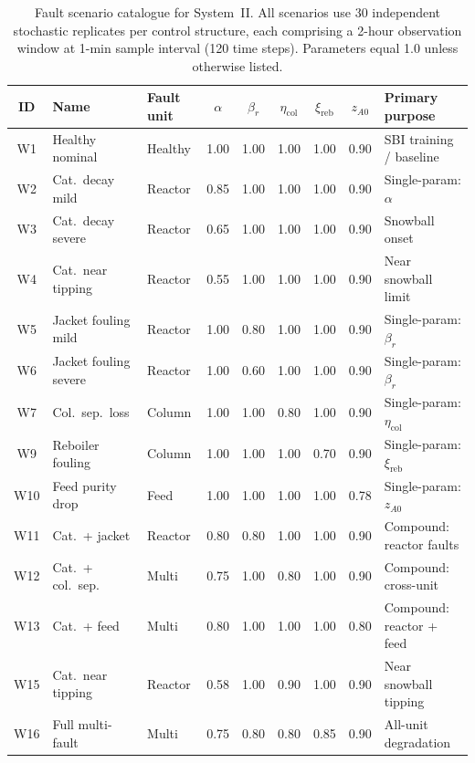 \documentclass[aps,pre,twocolumn,superscriptaddress,floatfix]{revtex4-2}
\begin{document}
\begin{table}[tb]
\centering
\caption{Fault scenario catalogue for System~II. All scenarios use 30 independent
  stochastic replicates per control structure, each comprising a 2-hour observation
  window at 1-min sample interval (120 time steps). Parameters equal 1.0 unless
  otherwise listed.}
\label{tab:si_wu_scenarios}
\small
\begin{tabular}{cllcccccl}
\toprule
ID & Name & Fault unit & $\alpha$ & $\beta_r$ & $\eta_\mathrm{col}$ & $\xi_\mathrm{reb}$ & $z_{A0}$ & Primary purpose \\
\midrule
W1  & Healthy nominal     & Healthy  & 1.00 & 1.00 & 1.00 & 1.00 & 0.90 & SBI training / baseline \\
W2  & Cat.~decay mild     & Reactor  & 0.85 & 1.00 & 1.00 & 1.00 & 0.90 & Single-param: $\alpha$ \\
W3  & Cat.~decay severe   & Reactor  & 0.65 & 1.00 & 1.00 & 1.00 & 0.90 & Snowball onset \\
W4  & Cat.~near tipping   & Reactor  & 0.55 & 1.00 & 1.00 & 1.00 & 0.90 & Near snowball limit \\
W5  & Jacket fouling mild & Reactor  & 1.00 & 0.80 & 1.00 & 1.00 & 0.90 & Single-param: $\beta_r$ \\
W6  & Jacket fouling severe& Reactor & 1.00 & 0.60 & 1.00 & 1.00 & 0.90 & Single-param: $\beta_r$ \\
W7  & Col.~sep.~loss      & Column   & 1.00 & 1.00 & 0.80 & 1.00 & 0.90 & Single-param: $\eta_\mathrm{col}$ \\
W9  & Reboiler fouling    & Column   & 1.00 & 1.00 & 1.00 & 0.70 & 0.90 & Single-param: $\xi_\mathrm{reb}$ \\
W10 & Feed purity drop    & Feed     & 1.00 & 1.00 & 1.00 & 1.00 & 0.78 & Single-param: $z_{A0}$ \\
W11 & Cat.~+ jacket       & Reactor  & 0.80 & 0.80 & 1.00 & 1.00 & 0.90 & Compound: reactor faults \\
W12 & Cat.~+ col.~sep.    & Multi    & 0.75 & 1.00 & 0.80 & 1.00 & 0.90 & Compound: cross-unit \\
W13 & Cat.~+ feed         & Multi    & 0.80 & 1.00 & 1.00 & 1.00 & 0.80 & Compound: reactor + feed \\
W15 & Cat.~near tipping   & Reactor  & 0.58 & 1.00 & 0.90 & 1.00 & 0.90 & Near snowball tipping \\
W16 & Full multi-fault    & Multi    & 0.75 & 0.80 & 0.80 & 0.85 & 0.90 & All-unit degradation \\
\bottomrule
\end{tabular}
\end{table}
\end{document}
